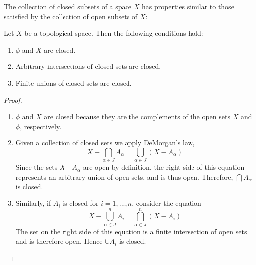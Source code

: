 \documentclass[a4paper,english,12pt]{article}
\begin{document}
The collection of closed subsets of a space $X$ has properties similar to those satisfied by the collection of open subsets of $X$:

\begin{thm}
	Let $X$ be a topological space. Then the following conditions hold:
	\begin{enumerate}
		\item $\phi$ and $X$ are closed.
		\item Arbitrary intersections of closed sets are closed.
		\item Finite unions of closed sets are closed.
	\end{enumerate}
\end{thm}

\begin{proof}
	\begin{enumerate}
		\item $\phi$ and $X$ are closed because they are the complements of the open sets $X$ and $\phi$, respectively.
		
		\item Given a collection of closed sets we apply DeMorgan's law,
		\[X-\bigcap_{\alpha \in J} A_\alpha = \bigcup_{\alpha \in J} (X-A_\alpha)\]
		Since the sets $X — A_\alpha$ are open by definition, the right side of this equation represents	an arbitrary union of open sets, and is thus open. Therefore, $\bigcap A_\alpha$ is closed.
		
		\item Similarly, if $A_i$ is closed for $i = 1,...,n$, consider the equation
		\[X-\bigcup_{\alpha \in J}^n A_i = \bigcap_{\alpha \in J}^n (X-A_i) \]
		The set on the right side of this equation is a finite intersection of open sets and is therefore open. Hence $\cup A_i$ is closed.
	\end{enumerate}
\end{proof}
	
	
\end{document}
